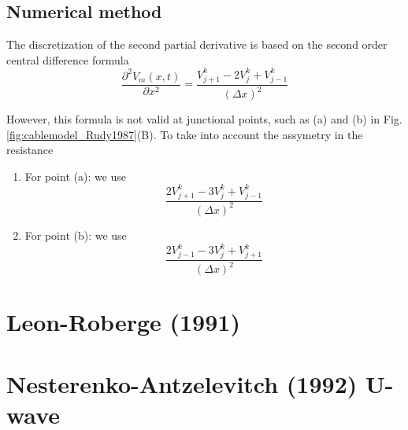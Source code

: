 \subsection{Numerical method}

The discretization of the second partial derivative is based on the second order
central difference formula
\begin{equation}
\frac{\partial^2 V_m(x,t)}{\partial x^2} = \frac{V_{j+1}^k - 2 V_j^k +
V_{j-1}^k}{(\Delta x)^2}
\end{equation}

However, this formula is not valid at junctional points, such as (a) and (b) in
Fig.\ref{fig:cablemodel_Rudy1987}(B). To take into account the assymetry in the
resistance
\begin{enumerate}
  \item For point (a): we use
  \begin{equation}
  \frac{2V_{j+1}^k - 3 V_{j}^k + V_{j-1}^k}{(\Delta x)^2}
  \end{equation}
  \item For point (b): we use
  \begin{equation}
  \frac{2V_{j-1}^k - 3 V_{j}^k + V_{j+1}^k}{(\Delta x)^2}
  \end{equation}
\end{enumerate}


\section{Leon-Roberge (1991)}

\citep{leon1991} 

\citep{leon1994} 

\section{Nesterenko-Antzelevitch (1992) U-wave}

